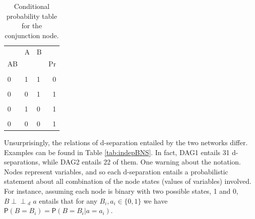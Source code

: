 \documentclass[
  10pt,
  dvipsnames,enabledeprecatedfontcommands]{scrartcl}
\newcommand{\indep}{\!\perp \!\!\! \perp\!}
\newcommand{\pr}[1]{\ensuremath{\mathsf{P}(#1)}}
\begin{document}
\begin{table}[h]
\begin{table}[H]
\centering
\begin{tabular}{lllr}
\toprule
\multicolumn{1}{c}{} & \multicolumn{1}{c}{A} & \multicolumn{1}{c}{B} & \multicolumn{1}{c}{} \\
AB &  &  & Pr\\
\midrule
\cellcolor{gray!6}{1} & \cellcolor{gray!6}{1} & \cellcolor{gray!6}{1} & \cellcolor{gray!6}{1}\\
0 & 1 & 1 & 0\\
\cellcolor{gray!6}{1} & \cellcolor{gray!6}{0} & \cellcolor{gray!6}{1} & \cellcolor{gray!6}{0}\\
0 & 0 & 1 & 1\\
\cellcolor{gray!6}{1} & \cellcolor{gray!6}{1} & \cellcolor{gray!6}{0} & \cellcolor{gray!6}{0}\\
0 & 1 & 0 & 1\\
\cellcolor{gray!6}{1} & \cellcolor{gray!6}{0} & \cellcolor{gray!6}{0} & \cellcolor{gray!6}{0}\\
0 & 0 & 0 & 1\\
\bottomrule
\end{tabular}
\end{table}
\normalsize
\caption{Conditional probability table for the conjunction node.}
\label{tab:CPTconjunction2}
\end{table}

\newpage 
\vspace{1mm}
\footnotesize

\normalsize

Unsurprisingly, the relations of d-separation entailed by the two
networks differ. Examples can be found in Table \ref{tab:indepBNS}. In
fact, \textsf{DAG1} entails 31 d-separations, while \textsf{DAG2}
entails 22 of them. One warning about the notation. Nodes represent
variables, and so each d-separation entails a probabilistic statement
about all combination of the node states (values of variables) involved.
For instance, assuming each node is binary with two possible states, 1
and 0, \mbox{$B   \indep_d\,\,  a $} entails that for any
\mbox{$ B_i, a_i \in \{0, 1\}$} we have
\(\pr{B = B_i} = \pr{B = B_i \vert a = a_i}\).
\end{document}
